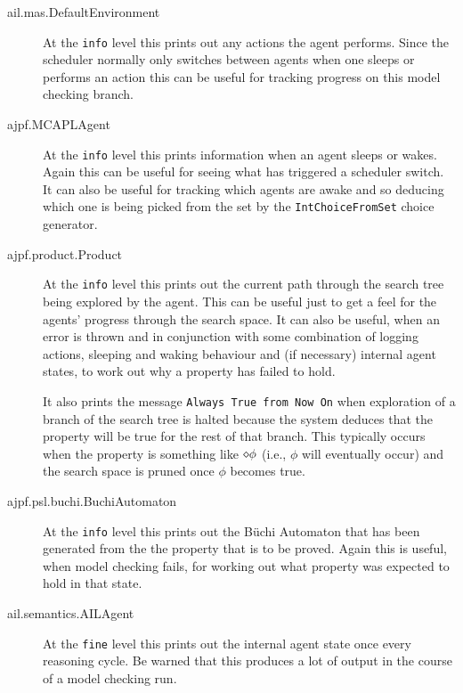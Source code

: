 \begin{description}
\item[ail.mas.DefaultEnvironment] At the \texttt{info} level this prints out any actions the agent performs.  Since the scheduler normally only switches between agents when one sleeps or performs an action this can be useful for tracking progress on this model checking branch.
\item[ajpf.MCAPLAgent] At the \texttt{info} level this prints information when an agent sleeps or wakes.  Again this can be useful for seeing what has triggered a scheduler switch.  It can also be useful for tracking which agents are awake and so deducing which one is being picked from the set by the \texttt{IntChoiceFromSet} choice generator.
\item[ajpf.product.Product] At the \texttt{info} level this prints out the current path through the search tree being explored by the agent.  This can be useful just to get a feel for the agents' progress through the search space.  It can also be useful, when an error is thrown and in conjunction with some combination of logging actions, sleeping and waking behaviour and (if necessary) internal agent states, to work out why a property has failed to hold.

It also prints the message \texttt{Always True from Now On} when exploration of a branch of the search tree is halted because the system deduces that the property will be true for the rest of that branch.  This typically occurs when the property is something like $\diamond \phi$ (i.e., $\phi$ will eventually occur) and the search space is pruned once $\phi$ becomes true.
\item[ajpf.psl.buchi.BuchiAutomaton] At the \texttt{info} level this prints out the B\"{u}chi Automaton that has been generated from the the property that is to be proved.  Again this is useful, when model checking fails, for working out what property was expected to hold in that state.
\item[ail.semantics.AILAgent] At the \texttt{fine} level this prints out the internal agent state once every reasoning cycle.  Be warned that this produces a lot of output in the course of a model checking run.
\end{description}

